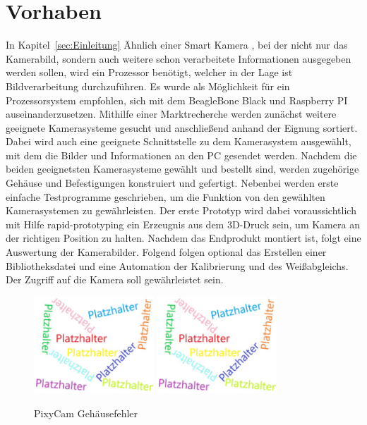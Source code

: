 \section{Vorhaben}
In Kapitel~\ref{sec:Einleitung} Ähnlich einer Smart Kamera \cite{festo_dok}, bei der nicht nur das Kamerabild, sondern auch weitere schon verarbeitete Informationen ausgegeben werden sollen, wird ein Prozessor benötigt, welcher in der Lage ist Bildverarbeitung durchzuführen. Es wurde als Möglichkeit für ein Prozessorsystem empfohlen, sich mit dem BeagleBone Black und Raspberry PI auseinanderzusetzen. Mithilfe einer Marktrecherche werden zunächst weitere geeignete Kamerasysteme gesucht und anschließend anhand der Eignung sortiert. Dabei wird auch eine geeignete Schnittstelle zu dem Kamerasystem ausgewählt, mit dem die Bilder und Informationen an den PC gesendet werden. Nachdem die beiden geeignetsten Kamerasysteme gewählt und bestellt sind, werden zugehörige Gehäuse und Befestigungen konstruiert und gefertigt. Nebenbei werden erste einfache Testprogramme geschrieben, um die Funktion von den gewählten Kamerasystemen zu gewährleisten. Der erste Prototyp wird dabei voraussichtlich mit Hilfe rapid-prototyping ein Erzeugnis aus dem 3D-Druck sein, um Kamera an der richtigen Position zu halten. Nachdem das Endprodukt montiert ist, folgt eine Auswertung der Kamerabilder. Folgend folgen optional das Erstellen einer Bibliotheksdatei und eine Automation der Kalibrierung und des Weißabgleichs. Der Zugriff auf die Kamera soll gewährleistet sein. 

\begin{figure}[htb]
    \centering
    \includegraphics[width=0.4\textwidth]{Abbildungen/Platzhalter.jpg}
    \includegraphics[width=0.4\textwidth]{Abbildungen/Platzhalter.jpg}
    \caption{PixyCam Gehäusefehler}		
    \label{fig:Pixy_Fehler}
\end{figure}

